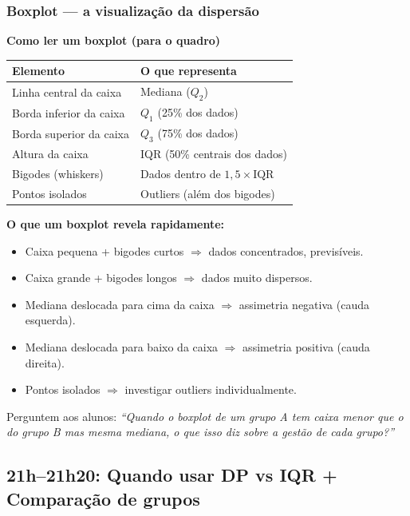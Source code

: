 \subsubsection*{Boxplot — a visualização da dispersão}

\begin{BoardBox}
\textbf{Como ler um boxplot (para o quadro)}

\begin{center}
\begin{tabular}{|l|p{10cm}|}
\hline
\textbf{Elemento} & \textbf{O que representa} \\
\hline
Linha central da caixa & Mediana ($Q_2$) \\
Borda inferior da caixa & $Q_1$ (25\% dos dados) \\
Borda superior da caixa & $Q_3$ (75\% dos dados) \\
Altura da caixa & IQR (50\% centrais dos dados) \\
Bigodes (whiskers) & Dados dentro de $1{,}5 \times \text{IQR}$ \\
Pontos isolados & Outliers (além dos bigodes) \\
\hline
\end{tabular}
\end{center}

\textbf{O que um boxplot revela rapidamente:}
\begin{itemize}
  \item Caixa pequena + bigodes curtos $\Rightarrow$ dados concentrados, previsíveis.
  \item Caixa grande + bigodes longos $\Rightarrow$ dados muito dispersos.
  \item Mediana deslocada para cima da caixa $\Rightarrow$ assimetria negativa (cauda esquerda).
  \item Mediana deslocada para baixo da caixa $\Rightarrow$ assimetria positiva (cauda direita).
  \item Pontos isolados $\Rightarrow$ investigar outliers individualmente.
\end{itemize}
\end{BoardBox}

Perguntem aos alunos: \textit{``Quando o boxplot de um grupo A tem caixa menor
que o do grupo B mas mesma mediana, o que isso diz sobre a gestão de cada grupo?''}

\subsection{21h–21h20: Quando usar DP vs IQR + Comparação de grupos}

